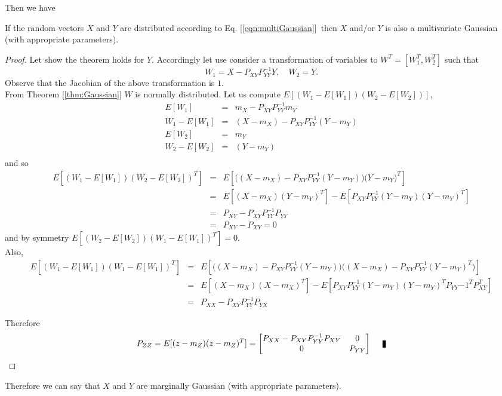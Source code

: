 Then we have 
\begin{theorem}
\label{thm:jointlyDistributed}
If the random vectors $X$ and $Y$ are distributed according to Eq. [\ref{eqn:multiGaussian}]\, then $X$ and/or $Y$ is also a multivariate Gaussian (with appropriate parameters). 
\end{theorem}
\begin{proof} Let show the theorem holds for $Y$. Accordingly let use consider a transformation of variables to $W^T = [W_1^T, W_2^T]$ such that 
$$W_1 = X - P_{XY}P_{YY}^{-1} Y, \quad W_2 = Y.$$
Observe that the Jacobian of the above transformation is $1$.\\

From Theorem [\ref{thm:Gaussian}] $W$ is normally distributed. Let us compute $E[(W_1 - E[W_1])(W_2 - E[W_2])]$,
\begin{eqnarray*}
E[W_1] &=& m_X - P_{XY}P_{YY}^{-1}m_Y\\
W_1 - E[W_1] &=& (X-m_X) - P_{XY}P_{YY}^{-1}(Y-m_Y) \\
E[W_2] &=& m_Y\\
W_2 - E[W_2] &=& (Y-m_Y) \\
\end{eqnarray*} and so
\begin{eqnarray*}
E[(W_1 -E[W_1])(W_2 - E[W_2])^T] &=& E [ \big( (X-m_X) - P_{XY}P_{YY}^{-1}(Y-m_Y)\big) \big(Y -m_Y\big)^T] \\
&=& E[(X-m_X)(Y-m_Y)^T] - E[P_{XY}P_{YY}^{-1}(Y-m_Y)(Y-m_Y)^T]\\
&=& P_{XY} - P_{XY}P_{YY}^{-1}P_{YY} \\
&=& P_{XY} - P_{XY} = 0
\end{eqnarray*} and by symmetry $E[(W_2 -E[W_2])(W_1 - E[W_1])^T] = 0$.\\

Also, 
\begin{eqnarray*}
E[(W_1 -E[W_1])(W_1 - E[W_1])^T] &=& E [ \big( (X-m_X) - P_{XY}P_{YY}^{-1}(Y-m_Y)\big) \big( (X-m_X) - P_{XY}P_{YY}^{-1}(Y-m_Y)^T \big)] \\
&=& E[(X-m_X)(X-m_X)^T] - E[P_{XY} P_{YY}^{-1} (Y-m_Y)(Y-m_Y)^T P_{YY}{-1}^T P_{XY}^T]\\
&=& P_{XX} - P_{XY}P_{YY}^{-1}P_{YX}
\end{eqnarray*} 

Therefore
$$P_{ZZ} = E[(z - m_Z)(z-m_Z)^T] =  
\begin{bmatrix}
P_{XX} -P_{XY}P_{YY}^{-1}P_{XY}  & 0 \\
0 & P_{YY}
\end{bmatrix}\qed$$\end{proof}
Therefore we can say that $X$ and $Y$ are marginally Gaussian (with appropriate parameters).\\

